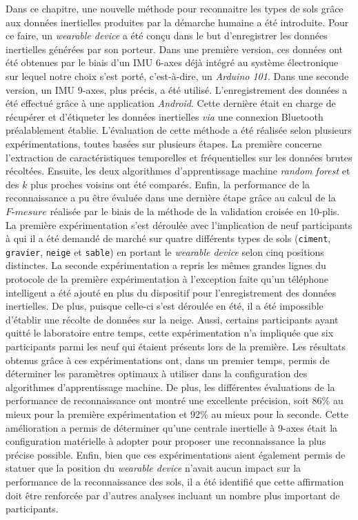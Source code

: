 Dans ce chapitre, une nouvelle méthode pour reconnaitre les types de sols grâce aux données inertielles produites par la démarche humaine a été introduite. Pour ce faire, un \textit{wearable device} a été conçu dans le but d'enregistrer les données inertielles générées par son porteur. Dans une première version, ces données ont été obtenues par le biais d'un \acs{IMU} 6-axes déjà intégré au système électronique sur lequel notre choix s'est porté, c'est-à-dire, un \textit{Arduino 101}. Dans une seconde version, un \acs{IMU} 9-axes, plus précis, a été utilisé. L'enregistrement des données a été effectué grâce à une application \textit{Android}. Cette dernière était en charge de récupérer et d'étiqueter les données inertielles \textit{via} une connexion Bluetooth préalablement établie. L'évaluation de cette méthode a été réalisée selon plusieurs expérimentations, toutes basées sur plusieurs étapes. La première concerne l'extraction de caractéristiques temporelles et fréquentielles sur les données brutes récoltées. Ensuite, les deux algorithmes d'apprentissage machine \textit{random forest} et des $k$ plus proches voisins ont été comparés. Enfin, la performance de la reconnaissance a pu être évaluée dans une dernière étape grâce au calcul de la $F\mbox{-} mesure$ réalisée par le biais de la méthode de la validation croisée en 10-plis. La première expérimentation s'est déroulée avec l'implication de neuf participants à qui il a été demandé de marché sur quatre différents types de sols (\texttt{ciment}, \texttt{gravier}, \texttt{neige} et \texttt{sable}) en portant le \textit{wearable device} selon cinq positions distinctes. La seconde expérimentation a repris les mêmes grandes lignes du protocole de la première expérimentation à l'exception faite qu'un téléphone intelligent a été ajouté en plus du dispositif pour l'enregistrement des données inertielles. De plus, puisque celle-ci s'est déroulée en été, il a été impossible d'établir une récolte de données sur la neige. Aussi, certains participants ayant quitté le laboratoire entre temps, cette expérimentation n'a impliquée que six participants parmi les neuf qui étaient présents lors de la première. Les résultats obtenus grâce à ces expérimentations ont, dans un premier temps, permis de déterminer les paramètres optimaux à utiliser dans la configuration des algorithmes d'apprentissage machine. De plus, les différentes évaluations de la performance de reconnaissance ont montré une excellente précision, soit 86\% au mieux pour la première expérimentation et 92\% au mieux pour la seconde. Cette amélioration a permis de déterminer qu'une centrale inertielle à 9-axes était la configuration matérielle à adopter pour proposer une reconnaissance la plus précise possible. Enfin, bien que ces expérimentations aient également permis de statuer que la position du \textit{wearable device} n'avait aucun impact sur la performance de la reconnaissance des sols, il a été identifié que cette affirmation doit être renforcée par d'autres analyses incluant un nombre plus important de participants.
